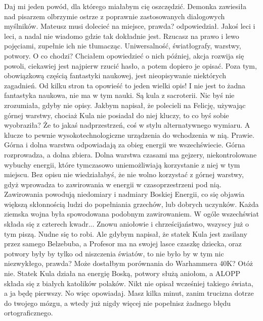 \begin{dialogue}
\ds{} Daj mi jeden powód, dla którego miałabym cię oszczędzić. \dm{} Demonka zawiesiła nad pisarzem olbrzymie ostrze z poprawnie zastosowanych dialogowych myślników.
\ds{} Mateusz musi dolecieć na miejsce, prawda? \dm{} odpowiedział.
\ds{} Jakoś leci i leci, a nadal nie wiadomo gdzie tak dokładnie jest. Rzucasz na prawo i lewo pojęciami, zupełnie ich nie tłumacząc.
Uniwersalność, światłografy, warstwy, potwory. O co chodzi?
\ds{} Chciałem opowiedzieć o nich później, akcja rozwija się powoli, ciekawiej jest najpierw rzucić hasło, a potem dopiero je opisać.
Poza tym, obowiązkową częścią fantastyki naukowej, jest nieopisywanie niektórych zagadnień.
\ds{} Od kilku stron ta opowieść to jeden wielki opis! I nie jest to żadna fantastyka naukowa, nie ma w tym nauki. Są kula z sacroterii.
\ds{} Nic byś nie zrozumiała, gdyby nie opisy. Jakbym napisał, że polecieli na Felicję, używając górnej warstwy, chociaż Kula nie posiadał do niej kluczy, to co byś sobie wyobraziła?
\ds{} Że to jakaś nadprzestrzeń, coś w stylu alternatywnego wymiaru. A klucze to pewnie wysokotechnologiczne urządzenia do wchodzenia w nią.
\ds{} Prawie. Górna i dolna warstwa odpowiadają za obieg energii we wszechświecie. Górna rozprowadza, a dolna zbiera.
Dolna warstwa czasami ma gejzery, niekontrolowane wybuchy energii, które tymczasowo uniemożliwiają korzystanie z niej w tym miejscu.
Bez opisu nie wiedziałabyś, że nie wolno korzystać z górnej warstwy, gdyż wprowadza to zawirowania w energii w czasoprzestrzeni pod nią.
Zawirowania powodują niedomiary i nadmiary Boskiej Energii, co się objawia większą skłonnością ludzi do popełniania grzechów, lub dobrych uczynków.
Każda ziemska wojna była spowodowana podobnym zawirowaniem.
W ogóle wszechświat składa się z czterech kwadr...
\ds{} Znowu aniołowie i chrześcijaństwo, wszyscy już o tym piszą. Nudne się to robi.
\ds{} Ale gdybym napisał, że statek Kula jest zasilany przez samego Belzebuba, a Profesor ma na swojej lasce czaszkę dziecka, oraz potwory były by tylko od niszczenia światów, to nie było by w tym nic niezwykłego, prawda? Może dostałbym porównania do Warhammera 40K? Otóż nie. Statek Kula działa na energię Boską, potwory służą aniołom, a ALOPP składa się z białych katolików polaków. 
Nikt nie opisał wcześniej takiego świata, a ja będę pierwszy.
\ds{} No więc opowiadaj. Masz kilka minut, zanim trucizna dotrze do twojego mózgu, a wtedy już nigdy więcej nie popełnisz żadnego błędu ortograficznego.
\end{dialogue}

